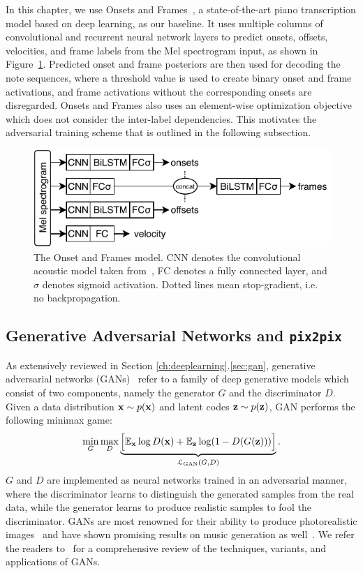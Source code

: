 In this chapter, we use Onsets and Frames~\cite{hawthorne2018onsetsframes}, a state-of-the-art piano transcription model based on deep learning, as our baseline.
It uses multiple columns of convolutional and recurrent neural network layers to predict onsets, offsets, velocities, and frame labels from the Mel spectrogram input, as shown in Figure~\ref{fig:onsetsframes}.
Predicted onset and frame posteriors are then used for decoding the note sequences, where a threshold value is used to create binary onset and frame activations, and frame activations without the corresponding onsets are disregarded.
Onsets and Frames also uses an element-wise optimization objective which does not consider the inter-label dependencies.
This motivates the adversarial training scheme that is outlined in the following subsection.


\begin{figure}[t]
	\centering
	\includegraphics[width=0.8\columnwidth]{onsetsframes.pdf}
	\caption{The Onset and Frames model. CNN denotes the convolutional acoustic model taken from~\protect\cite{kelz2016framewise}, FC denotes a fully connected layer, and $\sigma$ denotes sigmoid activation. Dotted lines mean stop-gradient, i.e. no backpropagation.}
	\label{fig:onsetsframes}
\end{figure}


\subsection{Generative Adversarial Networks and \texttt{pix2pix}}

As extensively reviewed in Section \ref{ch:deeplearning}.\ref{sec:gan}, generative adversarial networks (GANs)~\cite{goodfellow2014gan} refer to a family of deep generative models which consist of two components, namely the generator $G$ and the discriminator $D$.
Given a data distribution $\mathbf{x} \sim p(\mathbf{x})$ and latent codes $\mathbf{z} \sim p(\mathbf{z})$, GAN performs the following minimax game:
\begin{equation}\label{eqn:gan}
\min_{G} \max_{D}  \underbrace{\Big [ \mathbb{E}_{\mathbf{x}} \log D(\mathbf{x}) + \mathbb{E}_{\mathbf{z}} \log (1 - D ( G(\mathbf{z}))) \Big ]}_{\mathcal{L}_{\text{GAN}}(G, D)}.
\end{equation}
$G$ and $D$ are implemented as neural networks trained in an adversarial manner, where the discriminator learns to distinguish the generated samples from the real data, while the generator learns to produce realistic samples to fool the discriminator.
GANs are most renowned for their ability to produce photorealistic images~\cite{karras2019stylegan} and have shown promising results on music generation as well~\cite{engel2019gansynth,dong2018musegan,yang2017midinet}.
We refer the readers to~\cite{goodfellow2016gan,creswell2017gan} for a comprehensive review of the techniques, variants, and applications of GANs.

